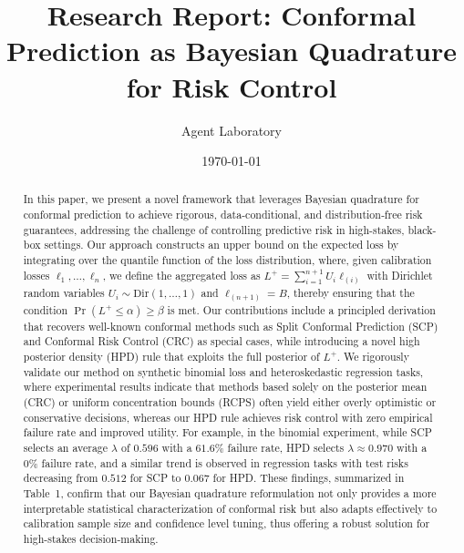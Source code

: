 \documentclass{article} %
\title{Research Report: Conformal Prediction as Bayesian Quadrature for Risk Control}
\author{Agent Laboratory}
\date{\today}
\begin{document}
\maketitle

\begin{abstract}
In this paper, we present a novel framework that leverages Bayesian quadrature for conformal prediction to achieve rigorous, data-conditional, and distribution‐free risk guarantees, addressing the challenge of controlling predictive risk in high-stakes, black-box settings. Our approach constructs an upper bound on the expected loss by integrating over the quantile function of the loss distribution, where, given calibration losses $\ell_1, \dots, \ell_n$, we define the aggregated loss as $L^+ = \sum_{i=1}^{n+1} U_i \ell_{(i)}$ with Dirichlet random variables $U_i \sim \text{Dir}(1,\ldots,1)$ and $\ell_{(n+1)} = B$, thereby ensuring that the condition $\Pr(L^+ \leq \alpha) \geq \beta$ is met. Our contributions include a principled derivation that recovers well-known conformal methods such as Split Conformal Prediction (SCP) and Conformal Risk Control (CRC) as special cases, while introducing a novel high posterior density (HPD) rule that exploits the full posterior of $L^+$. We rigorously validate our method on synthetic binomial loss and heteroskedastic regression tasks, where experimental results indicate that methods based solely on the posterior mean (CRC) or uniform concentration bounds (RCPS) often yield either overly optimistic or conservative decisions, whereas our HPD rule achieves risk control with zero empirical failure rate and improved utility. For example, in the binomial experiment, while SCP selects an average $\lambda$ of $0.596$ with a $61.6\%$ failure rate, HPD selects $\lambda \approx 0.970$ with a $0\%$ failure rate, and a similar trend is observed in regression tasks with test risks decreasing from $0.512$ for SCP to $0.067$ for HPD. These findings, summarized in Table~1, confirm that our Bayesian quadrature reformulation not only provides a more interpretable statistical characterization of conformal risk but also adapts effectively to calibration sample size and confidence level tuning, thus offering a robust solution for high-stakes decision-making.
\end{abstract}
\end{document}
